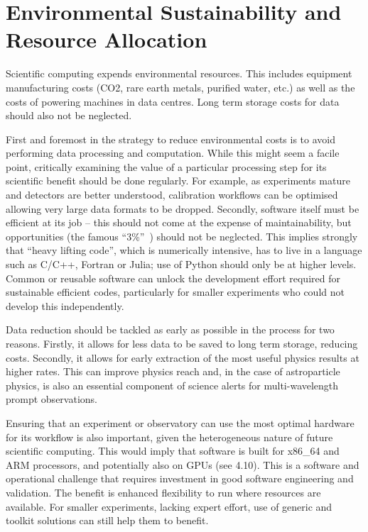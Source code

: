 \section{Environmental Sustainability and Resource Allocation}

Scientific computing expends environmental resources. This includes equipment manufacturing costs (CO2, rare earth metals, purified water, etc.) as well as the costs of powering machines in data centres. Long term storage costs for data should also not be neglected.

First and foremost in the strategy to reduce environmental costs is to avoid performing data processing and computation. While this might seem a facile point, critically examining the value of a particular processing step for its scientific benefit should be done regularly.  For example, as experiments mature and detectors are better understood, calibration workflows can be optimised allowing very large data formats to be dropped. Secondly, software itself must be efficient at its job -- this should not come at the expense of maintainability, but opportunities (the famous ``3\%''~\cite{10.1145/356635.356640}) should not be neglected. This implies strongly that ``heavy lifting code'', which is numerically intensive, has to live in a language such as C/C++, Fortran or Julia; use of Python should only be at higher levels. Common or reusable software can unlock the development effort required for sustainable efficient codes, particularly for smaller experiments who could not develop this independently.

Data reduction should be tackled as early as possible in the process for two reasons. Firstly, it allows for less data to be saved to long term storage, reducing costs. Secondly, it allows for early extraction of the most useful physics results at higher rates. This can improve physics reach and, in the case of astroparticle physics, is also an essential component of science alerts for multi-wavelength prompt observations.

Ensuring that an experiment or observatory can use the most optimal hardware for its workflow is also important, given the heterogeneous nature of future scientific computing. This would imply that software is built for x86\_64 and ARM processors, and potentially also on GPUs (see 4.10). This is a software and operational challenge that requires investment in good software engineering and validation. The benefit is enhanced flexibility to run where resources are available. For smaller experiments, lacking expert effort, use of generic and toolkit solutions can still help them to benefit.

